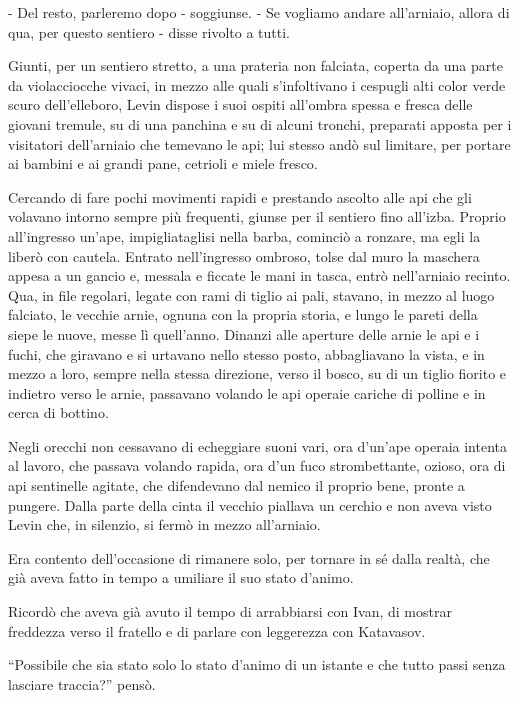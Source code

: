- Del resto, parleremo dopo - soggiunse. - Se vogliamo andare all'arniaio, allora di qua, per questo sentiero - disse rivolto a tutti. 

Giunti, per un sentiero stretto, a una prateria non falciata, coperta da una parte da violacciocche vivaci, in mezzo alle quali s'infoltivano i cespugli alti color verde scuro dell'elleboro, Levin dispose i suoi ospiti all'ombra spessa e fresca delle giovani tremule, su di una panchina e su di alcuni tronchi, preparati apposta per i visitatori dell'arniaio che temevano le api; lui stesso andò sul limitare, per portare ai bambini e ai grandi pane, cetrioli e miele fresco. 

Cercando di fare pochi movimenti rapidi e prestando ascolto alle api che gli volavano intorno sempre più frequenti, giunse per il sentiero fino all'izba. Proprio all'ingresso un'ape, impigliataglisi nella barba, cominciò a ronzare, ma egli la liberò con cautela. Entrato nell'ingresso ombroso, tolse dal muro la maschera appesa a un gancio e, messala e ficcate le mani in tasca, entrò nell'arniaio recinto. Qua, in file regolari, legate con rami di tiglio ai pali, stavano, in mezzo al luogo falciato, le vecchie arnie, ognuna con la propria storia, e lungo le pareti della siepe le nuove, messe lì quell'anno. Dinanzi alle aperture delle arnie le api e i fuchi, che giravano e si urtavano nello stesso posto, abbagliavano la vista, e in mezzo a loro, sempre nella stessa direzione, verso il bosco, su di un tiglio fiorito e indietro verso le arnie, passavano volando le api operaie cariche di polline e in cerca di bottino. 

Negli orecchi non cessavano di echeggiare suoni vari, ora d'un'ape operaia intenta al lavoro, che passava volando rapida, ora d'un fuco strombettante, ozioso, ora di api sentinelle agitate, che difendevano dal nemico il proprio bene, pronte a pungere. Dalla parte della cinta il vecchio piallava un cerchio e non aveva visto Levin che, in silenzio, si fermò in mezzo all'arniaio. 

Era contento dell'occasione di rimanere solo, per tornare in sé dalla realtà, che già aveva fatto in tempo a umiliare il suo stato d'animo. 

Ricordò che aveva già avuto il tempo di arrabbiarsi con Ivan, di mostrar freddezza verso il fratello e di parlare con leggerezza con Katavasov. 

``Possibile che sia stato solo lo stato d'animo di un istante e che tutto passi senza lasciare traccia?'' pensò. 

